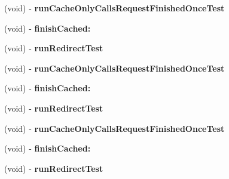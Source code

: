 \begin{DoxyCompactItemize}
\item 
\hypertarget{interface_a_s_i_download_cache_tests_07_08_aad474ecba9439c09df908bc01d41df5b}{
(void) -\/ {\bfseries run\-Cache\-Only\-Calls\-Request\-Finished\-Once\-Test}}
\label{interface_a_s_i_download_cache_tests_07_08_aad474ecba9439c09df908bc01d41df5b}

\item 
\hypertarget{interface_a_s_i_download_cache_tests_07_08_a5d06a9be86a6e2fd994899a53c5306c0}{
(void) -\/ {\bfseries finish\-Cached\-:}}
\label{interface_a_s_i_download_cache_tests_07_08_a5d06a9be86a6e2fd994899a53c5306c0}

\item 
\hypertarget{interface_a_s_i_download_cache_tests_07_08_a7f2465bd232577824ffe2b37a06d2fe0}{
(void) -\/ {\bfseries run\-Redirect\-Test}}
\label{interface_a_s_i_download_cache_tests_07_08_a7f2465bd232577824ffe2b37a06d2fe0}

\item 
\hypertarget{interface_a_s_i_download_cache_tests_07_08_aad474ecba9439c09df908bc01d41df5b}{
(void) -\/ {\bfseries run\-Cache\-Only\-Calls\-Request\-Finished\-Once\-Test}}
\label{interface_a_s_i_download_cache_tests_07_08_aad474ecba9439c09df908bc01d41df5b}

\item 
\hypertarget{interface_a_s_i_download_cache_tests_07_08_a5d06a9be86a6e2fd994899a53c5306c0}{
(void) -\/ {\bfseries finish\-Cached\-:}}
\label{interface_a_s_i_download_cache_tests_07_08_a5d06a9be86a6e2fd994899a53c5306c0}

\item 
\hypertarget{interface_a_s_i_download_cache_tests_07_08_a7f2465bd232577824ffe2b37a06d2fe0}{
(void) -\/ {\bfseries run\-Redirect\-Test}}
\label{interface_a_s_i_download_cache_tests_07_08_a7f2465bd232577824ffe2b37a06d2fe0}

\item 
\hypertarget{interface_a_s_i_download_cache_tests_07_08_aad474ecba9439c09df908bc01d41df5b}{
(void) -\/ {\bfseries run\-Cache\-Only\-Calls\-Request\-Finished\-Once\-Test}}
\label{interface_a_s_i_download_cache_tests_07_08_aad474ecba9439c09df908bc01d41df5b}

\item 
\hypertarget{interface_a_s_i_download_cache_tests_07_08_a5d06a9be86a6e2fd994899a53c5306c0}{
(void) -\/ {\bfseries finish\-Cached\-:}}
\label{interface_a_s_i_download_cache_tests_07_08_a5d06a9be86a6e2fd994899a53c5306c0}

\item 
\hypertarget{interface_a_s_i_download_cache_tests_07_08_a7f2465bd232577824ffe2b37a06d2fe0}{
(void) -\/ {\bfseries run\-Redirect\-Test}}
\label{interface_a_s_i_download_cache_tests_07_08_a7f2465bd232577824ffe2b37a06d2fe0}


\end{DoxyCompactItemize}
